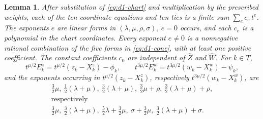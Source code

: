 \documentclass[11pt]{amsart}
\newtheorem{lemma}[theorem]{Lemma}
\theoremstyle{definition}
\theoremstyle{remark}
\begin{document}
{\begin{lemma}\label{lem:d1-chart}
After substitution of \eqref{eq:d1-chart} and multiplication by the prescribed weights,
each of the ten coordinate equations and ten ties is a finite sum $\sum_ec_e\,t^e$.
The exponents $e$ are linear forms in $(\lambda,\mu,\rho,\sigma)$, $e=0$ occurs, and each
$c_e$ is a polynomial in the chart coordinates.  Every exponent $e\ne0$ is a nonnegative
rational combination of the five forms in \eqref{eq:d1-cone}, with at least one positive
coefficient.  The constant coefficients $c_0$ are independent of $\hat Z$ and $\hat W$.
For $k\in T$,
\[
  t^{\mu/2}E^z_k=t^{\mu/2}(z_k-X^z_k)-\phi_k,\qquad
  t^{3\mu/2}E^w_k=t^{3\mu/2}(w_k-X^w_k)-\psi_k,
\]
and the exponents occurring in $t^{\mu/2}(z_k-X^z_k)$, respectively $t^{3\mu/2}(w_k-X^w_k)$, are
\[
\begin{gathered}
  \tfrac32\mu,\ \tfrac12(\lambda+\mu),\ \tfrac32(\lambda+\mu),\ \tfrac32\mu+\rho,\
  \tfrac32(\lambda+\mu)+\rho,\\
  \text{respectively}\\
  \tfrac32\mu,\ \tfrac32(\lambda+\mu),\ \tfrac52\lambda+\tfrac32\mu,\ \sigma+\tfrac32\mu,\
  \tfrac32(\lambda+\mu)+\sigma .
\end{gathered}
\]
\end{lemma}}
\end{document}
